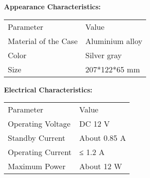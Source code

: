 \noindent\sihao\textbf{Appearance Characteristics:}
\vspace{0.1cm}
\song
\begin{table}[H]
\normalsize
{}
\begin{tabular}{m{6.5cm}|m{6.5cm}}
\rowcolor{myblue}
\color{white}Parameter& \color{white}Value\\\arrayrulecolor{tabcolor}\midrule[1.2pt]
Material of the Case& Aluminium alloy\\\arrayrulecolor{tabcolor}\midrule[1.2pt]
Color& Silver gray\\\arrayrulecolor{tabcolor}\midrule[1.2pt]
Size& 207*122*65 mm\\
\end{tabular}
\end{table}


\vspace{0.4cm}
\noindent\sihao\textbf{Electrical Characteristics:}
\vspace{0.1cm}
\song
\begin{table}[H]
\normalsize
{}
\begin{tabular}{m{6.5cm}|m{6.5cm}}
\rowcolor{myblue}
\color{white}Parameter& \color{white}Value\\\arrayrulecolor{tabcolor}\midrule[1.2pt]
Operating Voltage& DC 12 V\\\arrayrulecolor{tabcolor}\midrule[1.2pt]
Standby Current& About 0.85 A\\\arrayrulecolor{tabcolor}\midrule[1.2pt]
Operating Current& ≤ 1.2 A\\\arrayrulecolor{tabcolor}\midrule[1.2pt]
Maximum Power& About 12 W\\
\end{tabular}
\end{table}


